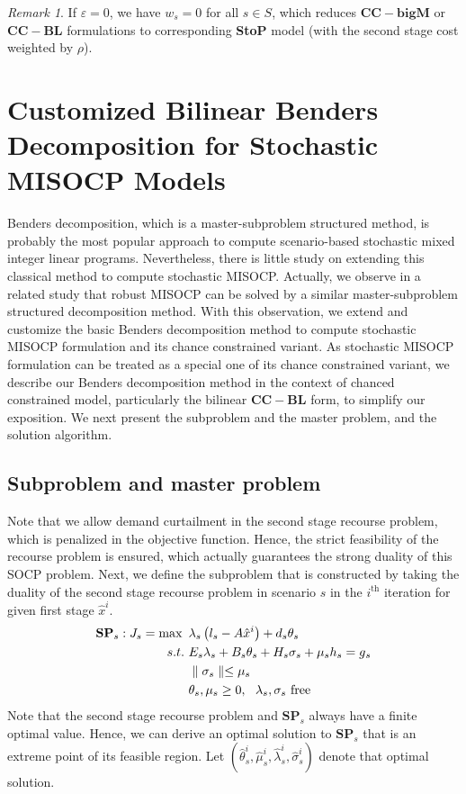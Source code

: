 \documentclass[journal]{IEEEtran}
\theoremstyle{remark}
\newtheorem{remark}{Remark}
\begin{document}
\begin{remark}If $\varepsilon=0$, we have $w_s=0$ for all $s\in S$, which reduces $\mathbf{CC\!-\! bigM}$ or $\mathbf{CC\!-\!BL}$ formulations to corresponding \textbf{StoP} model (with the second stage cost weighted by $\rho$).
\end{remark}


\section{Customized Bilinear Benders Decomposition for Stochastic  MISOCP Models}
\label{sect_benders}
Benders decomposition, which is a master-subproblem structured method, is probably the most popular approach to compute scenario-based stochastic mixed integer linear programs. Nevertheless, there is little study on extending this classical method to compute stochastic MISOCP. Actually, we observe in a related study \citep{Ding_SOCP}  that robust MISOCP can be solved by a similar master-subproblem structured decomposition method. With this observation, we extend and customize the basic Benders decomposition method to compute stochastic MISOCP formulation and its chance constrained variant. As stochastic MISOCP formulation can be treated as a special one of its chance constrained variant, we describe our Benders decomposition method in the context of chanced constrained model, particularly the bilinear $\mathbf{CC-BL}$ form,  to simplify our exposition. We next present the subproblem and the master problem, and the solution algorithm.

\subsection{Subproblem and master problem}
Note that we allow demand curtailment in the second stage recourse problem, which is penalized in the objective function. Hence, the strict feasibility of the recourse problem is ensured, which actually guarantees the strong duality of this SOCP problem.
Next, we define the subproblem that is constructed by taking the duality of the second stage recourse problem in scenario $s$ in the $i^\textrm{th}$ iteration for given first stage $\hat x^i$.
\begin{subequations}
\begin{align}
\mathbf{SP}_s: J_s = \max\,\,\,& {\lambda_s}\left(l_s - A \hat x^i \right) + {d_s}{\theta_s}   \\
   s.t.\,\, &   {E_s}{\lambda _s} + {B_s}{\theta _s} + {H_s}{\sigma _s} + {\mu _s}{h_s} = g{ _s}   \\
   & \parallel\sigma_s\parallel \le {\mu _s}        \\
   & \theta_s, \mu_s \ge 0,\,\,\,\, \lambda_s, \sigma_s \,\, \rm{free}
\end{align}
\end{subequations}
Note that the second stage recourse problem and $\mathbf{SP}_s$ always have a finite optimal value.  Hence, we can derive an optimal solution to $\mathbf{SP}_s$ that is an extreme point of its feasible region. Let $(\hat \theta^{i}_s, \hat \mu^i_s, \hat \lambda^i_s, \hat \sigma^i_s)$ denote that optimal solution.
\end{document}
